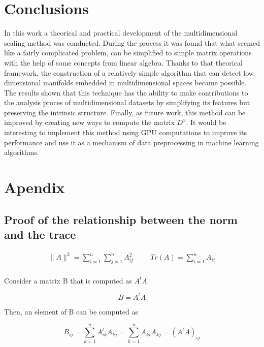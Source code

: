 \documentclass[12pt,journal]{IEEEtran}
\begin{document}
\section{Conclusions}

In this work a theorical and practical development of the multidimensional
scaling method was conducted. During the process it was found that what seemed like
a fairly complicated problem, can be simplified to simple matrix operations
with the help of some concepts from linear algebra. Thanks to that theorical
framework, the construction of a relatively simple algorithm that can detect
low dimensional manifolds embedded in multidimensional spaces became possible.
The results shown that this technique has the ability to make
contributions to the analysis proces of multidimensional datasets by
simplifying its features but preserving the intrinsic structure. Finally, as
future work, this method can be improved by creating new ways to compute the
matrix $D^x$. It would be interesting to implement this method using GPU
computations to improve its performance and use it as a mechanism of
data preprocessing in machine learning algorithms.

\section{Apendix}

    \subsection{Proof of the relationship between the norm and the trace} \label{norm_trace}

    \begin{equation*}
        \begin{aligned}
            \lVert A \rVert^2 = \sum_{i=1}^n \sum_{j=1}^n A_{ij}^2
            \hspace{1cm}
            Tr(A) = \sum_{i=1}^n A_{ii}
        \end{aligned}
    \end{equation*}\\

    Consider a matrix B that is computed as $A^tA$

    \begin{equation*}
        B = A^tA
    \end{equation*}

    Then, an element of B can be computed as

    \begin{equation*}
        B_{ij} = \sum_{k=1}^n A_{ik}^t A_{kj} = \sum_{k=1}^n A_{ki} A_{kj} = (A^tA)_{ij}
    \end{equation*}
\end{document}
